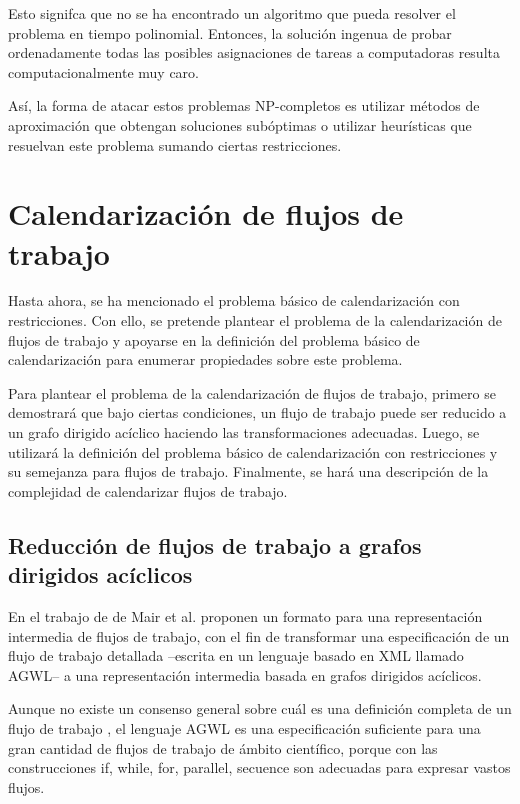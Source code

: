 \documentclass[letterpaper, 12pt]{report}
\begin{document}
Esto signifca que no se ha encontrado un algoritmo que pueda resolver el problema en tiempo polinomial. Entonces, la solución ingenua de probar ordenadamente todas las posibles asignaciones de tareas a computadoras resulta computacionalmente muy caro.

Así, la forma de atacar estos problemas NP-completos es utilizar métodos de aproximación \cite{leiserson2001introduction} que obtengan soluciones subóptimas o utilizar heurísticas que resuelvan este problema sumando ciertas restricciones.

\section{Calendarización de flujos de trabajo}
Hasta ahora, se ha mencionado el problema básico de calendarización con restricciones. Con ello, se pretende plantear el problema de la calendarización de flujos de trabajo y apoyarse en la definición del problema básico de calendarización para enumerar propiedades sobre este problema.

Para plantear el problema de la calendarización de flujos de trabajo, primero se demostrará que bajo ciertas condiciones, un flujo de trabajo puede ser reducido a un grafo dirigido acíclico haciendo las transformaciones adecuadas. Luego, se utilizará la definición del problema básico de calendarización con restricciones y su semejanza para flujos de trabajo. Finalmente, se hará una descripción de la complejidad de calendarizar flujos de trabajo.
\subsection{Reducción de flujos de trabajo a grafos dirigidos acíclicos}
En el trabajo de de Mair et al. \cite{mair2007workflow} proponen un formato para una representación intermedia de flujos de trabajo, con el fin de transformar una especificación de un flujo de trabajo detallada --escrita en un lenguaje basado en XML llamado AGWL-- a una representación intermedia basada en grafos dirigidos acíclicos.

Aunque no existe un consenso general sobre cuál es una definición completa de un flujo de trabajo \cite{van2003workflow}, el lenguaje AGWL es una especificación suficiente para una gran cantidad de flujos de trabajo de ámbito científico, porque con las construcciones if, while, for, parallel, secuence son adecuadas para expresar vastos flujos.
\end{document}
